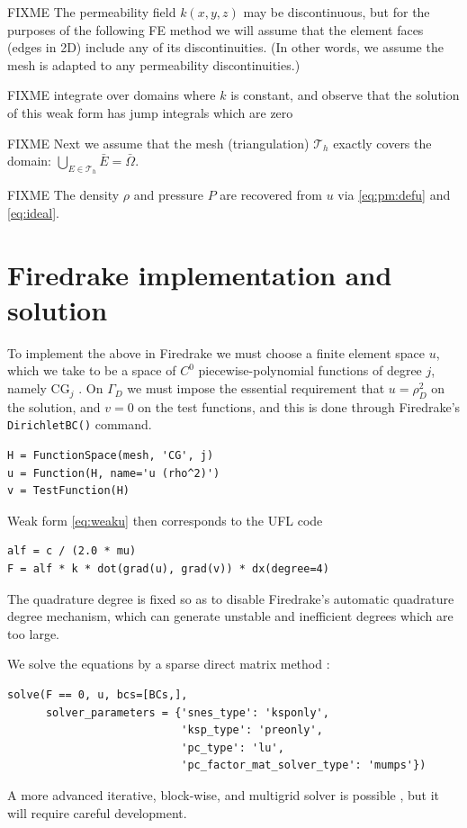 \documentclass[11pt]{amsart}
\newcommand{\cT}{\mathcal{T}}
\begin{document}
FIXME The permeability field $k(x,y,z)$ may be discontinuous, but for the purposes of the following FE method we will assume that the element faces (edges in 2D) include any of its discontinuities.  (In other words, we assume the mesh is adapted to any permeability discontinuities.)

FIXME integrate over domains where $k$ is constant, and observe that the solution of this weak form has jump integrals which are zero

FIXME Next we assume that the mesh (triangulation) $\cT_h$ exactly covers the domain: $\bigcup_{E\in\cT_h} \bar E = \bar \Omega$.

FIXME The density $\rho$ and pressure $P$ are recovered from $u$ via \eqref{eq:pm:defu} and \eqref{eq:ideal}.


\section{Firedrake implementation and solution}

To implement the above in Firedrake we must choose a finite element space $u$, which we take to be a space of $C^0$ piecewise-polynomial functions of degree $j$, namely $\text{CG}_j$ \citep{Elman2014}.  On $\Gamma_D$ we must impose the essential requirement that $u=\rho_D^2$ on the solution, and $v=0$ on the test functions, and this is done through Firedrake's \verb|DirichletBC()| command.
\begin{Verbatim}[fontsize=\small,frame=lines]
H = FunctionSpace(mesh, 'CG', j)
u = Function(H, name='u (rho^2)')
v = TestFunction(H)
\end{Verbatim}
Weak form \eqref{eq:weaku} then corresponds to the UFL code
\begin{Verbatim}[fontsize=\small,frame=lines]
alf = c / (2.0 * mu)
F = alf * k * dot(grad(u), grad(v)) * dx(degree=4)
\end{Verbatim}
The quadrature degree is fixed so as to disable Firedrake's automatic quadrature degree mechanism, which can generate unstable and inefficient degrees which are too large.

We solve the equations by a sparse direct matrix method \citep{Amestoy2001}:
\begin{Verbatim}[fontsize=\small,frame=lines]
solve(F == 0, u, bcs=[BCs,],
      solver_parameters = {'snes_type': 'ksponly',
                           'ksp_type': 'preonly',
                           'pc_type': 'lu',
                           'pc_factor_mat_solver_type': 'mumps'})
\end{Verbatim}
A more advanced iterative, block-wise, and multigrid solver is possible \citep[e.g.][]{Bueler2021}, but it will require careful development.
\end{document}
